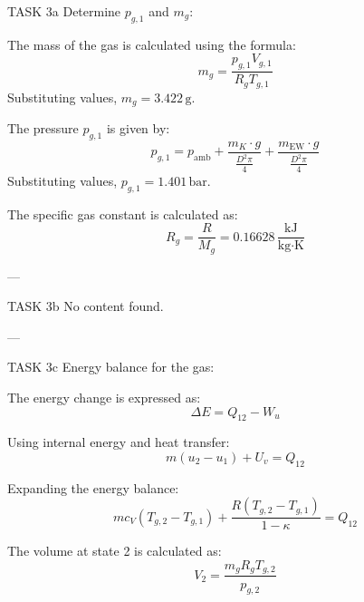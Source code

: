 TASK 3a  
Determine \( p_{g,1} \) and \( m_g \):  

The mass of the gas is calculated using the formula:  
\[
m_g = \frac{p_{g,1} V_{g,1}}{R_g T_{g,1}}
\]  
Substituting values, \( m_g = 3.422 \, \text{g} \).  

The pressure \( p_{g,1} \) is given by:  
\[
p_{g,1} = p_{\text{amb}} + \frac{m_K \cdot g}{\frac{D^2 \pi}{4}} + \frac{m_{\text{EW}} \cdot g}{\frac{D^2 \pi}{4}}
\]  
Substituting values, \( p_{g,1} = 1.401 \, \text{bar} \).  

The specific gas constant is calculated as:  
\[
R_g = \frac{R}{M_g} = 0.16628 \, \frac{\text{kJ}}{\text{kg·K}}
\]  

---

TASK 3b  
No content found.  

---

TASK 3c  
Energy balance for the gas:  

The energy change is expressed as:  
\[
\Delta E = Q_{12} - W_u
\]  

Using internal energy and heat transfer:  
\[
m(u_2 - u_1) + U_v = Q_{12}
\]  

Expanding the energy balance:  
\[
m c_V (T_{g,2} - T_{g,1}) + \frac{R (T_{g,2} - T_{g,1})}{1 - \kappa} = Q_{12}
\]  

The volume at state 2 is calculated as:  
\[
V_2 = \frac{m_g R_g T_{g,2}}{p_{g,2}}
\]  
